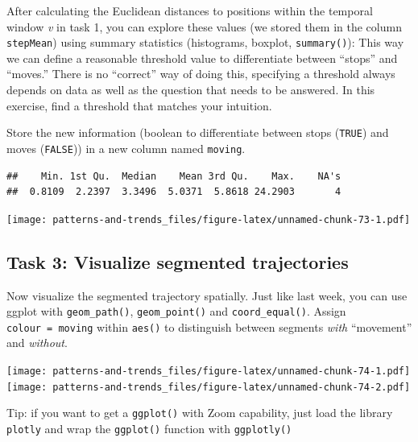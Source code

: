 \documentclass[
]{book}
\begin{document}
After calculating the Euclidean distances to positions within the temporal window \emph{v} in task 1, you can explore these values (we stored them in the column \texttt{stepMean}) using summary statistics (histograms, boxplot, \texttt{summary()}): This way we can define a reasonable threshold value to differentiate between ``stops'' and ``moves.'' There is no ``correct'' way of doing this, specifying a threshold always depends on data as well as the question that needs to be answered. In this exercise, find a threshold that matches your intuition.

Store the new information (boolean to differentiate between stops (\texttt{TRUE}) and moves (\texttt{FALSE})) in a new column named \texttt{moving}.

\begin{verbatim}
##    Min. 1st Qu.  Median    Mean 3rd Qu.    Max.    NA's 
##  0.8109  2.2397  3.3496  5.0371  5.8618 24.2903       4
\end{verbatim}

\texttt{[image: patterns-and-trends\_files/figure-latex/unnamed-chunk-73-1.pdf]}

\hypertarget{task-3-visualize-segmented-trajectories}{%
\subsection{Task 3: Visualize segmented trajectories}\label{task-3-visualize-segmented-trajectories}}

Now visualize the segmented trajectory spatially. Just like last week, you can use ggplot with \texttt{geom\_path()}, \texttt{geom\_point()} and \texttt{coord\_equal()}. Assign \texttt{colour\ =\ moving} within \texttt{aes()} to distinguish between segments \emph{with} ``movement'' and \emph{without}.

\texttt{[image: patterns-and-trends\_files/figure-latex/unnamed-chunk-74-1.pdf]} \texttt{[image: patterns-and-trends\_files/figure-latex/unnamed-chunk-74-2.pdf]}

Tip: if you want to get a \texttt{ggplot()} with Zoom capability, just load the library \texttt{plotly} and wrap the \texttt{ggplot()} function with \texttt{ggplotly()}
\end{document}
